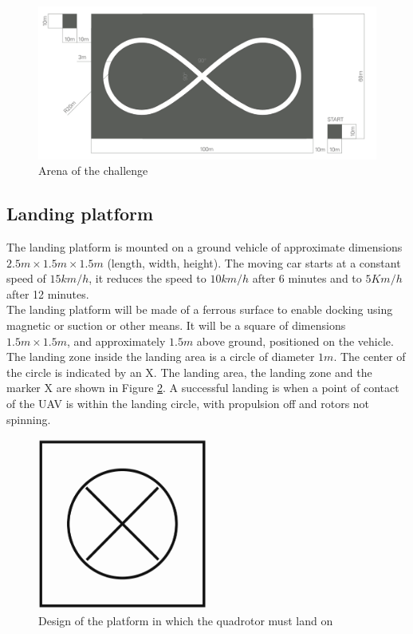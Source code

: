 \begin{figure}[!htbp]
    \centering
    \includegraphics[width=1.1\textwidth]{img/arena.png}
    \caption{Arena of the challenge}
    \label{fig:arenachallenge}
\end{figure}

\subsection{Landing platform}
The landing platform is mounted on a ground vehicle of approximate dimensions $2.5m \times 1.5m \times 1.5m$ (length, width, height). The moving car starts at a constant speed of $15km/h$, it reduces the speed to $10km/h$ after 6 minutes and to $5 Km/h$ after 12 minutes.\\
The landing platform will be made of a ferrous surface to enable docking using magnetic or suction or other means.
It will be a square of dimensions $1.5m \times 1.5m$, and approximately $1.5m$ above ground, positioned on the vehicle. 
The landing zone inside the landing area is a circle of diameter $1m$. The center of the circle is indicated by an X. The landing area, the landing zone and the marker X are shown in Figure \ref{fig:finalplatform}.
A successful landing is when a point of contact of the UAV is within the landing circle, with propulsion off and rotors not spinning.

\begin{figure}[!htbp]
    \centering
    \includegraphics[width=0.5\textwidth]{img/base.pdf}
    \caption{Design of the platform in which the quadrotor must land on}
    \label{fig:finalplatform}
\end{figure}

